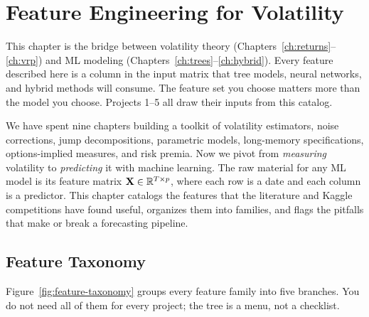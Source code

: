 
\chapter{Feature Engineering for Volatility}\label{ch:features}

\begin{application}
This chapter is the bridge between volatility theory (Chapters~\ref{ch:returns}--\ref{ch:vrp}) and ML modeling (Chapters~\ref{ch:trees}--\ref{ch:hybrid}).
Every feature described here is a column in the input matrix that tree models, neural networks, and hybrid methods will consume.
The feature set you choose matters more than the model you choose.
Projects 1--5 all draw their inputs from this catalog.
\end{application}

We have spent nine chapters building a toolkit of volatility estimators, noise corrections, jump decompositions, parametric models, long-memory specifications, options-implied measures, and risk premia.
Now we pivot from \emph{measuring} volatility to \emph{predicting} it with machine learning.
The raw material for any ML model is its feature matrix $\mathbf{X} \in \mathbb{R}^{T \times p}$, where each row is a date and each column is a predictor.
This chapter catalogs the features that the literature and Kaggle competitions have found useful, organizes them into families, and flags the pitfalls that make or break a forecasting pipeline.

\section{Feature Taxonomy}\label{sec:feat-taxonomy}

Figure~\ref{fig:feature-taxonomy} groups every feature family into five branches.
You do not need all of them for every project; the tree is a menu, not a checklist.

